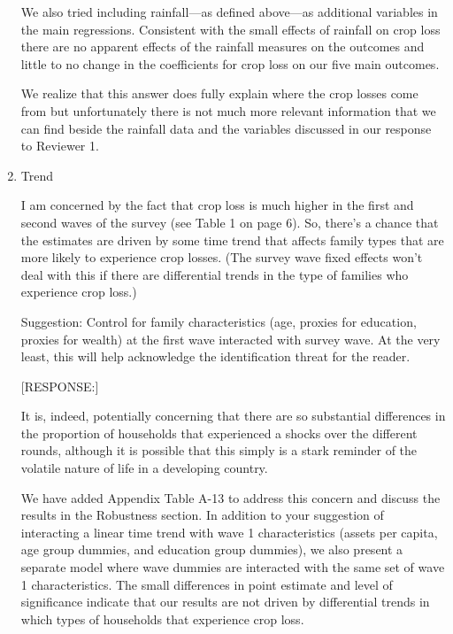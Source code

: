 \documentclass[letterpaper,12pt]{article}
\begin{document}
\begin{enumerate}
We also tried including rainfall---as defined above---as 
additional variables in the main regressions.
Consistent with the small effects of rainfall on crop loss
there are no apparent effects of the rainfall measures on the
outcomes and little to no change in the coefficients for crop
loss on our five main outcomes.

We realize that this answer does fully explain where the
crop losses come from but unfortunately there is not much
more relevant information that we can find beside the
rainfall data and the variables discussed in our response
to Reviewer 1.








\item Trend

I am concerned by the fact that crop loss is much higher in the first
and second waves of the survey (see Table 1 on page 6). So, there's a
chance that the estimates are driven by some time trend that affects
family types that are more likely to experience crop losses. (The survey
wave fixed effects won't deal with this if there are differential trends
in the type of families who experience crop loss.)

Suggestion: Control for family characteristics (age, proxies for
education, proxies for wealth) at the first wave interacted with survey
wave. At the very least, this will help acknowledge the identification
threat for the reader.


[RESPONSE:] 

It is, indeed, potentially concerning that there are so substantial
differences in the proportion of households that experienced a 
shocks over the different rounds, although it is possible that
this simply is a stark reminder of the volatile nature of life
in a developing country.

We have added Appendix Table A-13 to address this
concern and discuss the results in the Robustness section. 
In addition to your suggestion of interacting a linear
time trend with wave 1 characteristics (assets per capita,
age group dummies, and education group dummies), we also present
a separate model where wave dummies are interacted with the
same set of wave 1 characteristics.
The small differences in point estimate and level of significance 
indicate that our results are not driven by differential trends
in which types of households that experience crop loss.



\end{enumerate}
\end{document}
